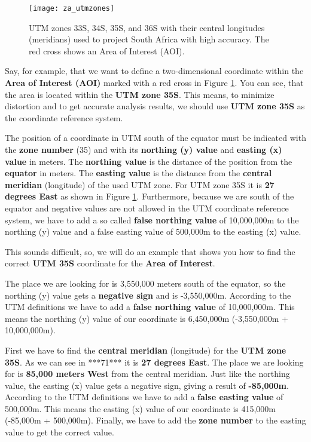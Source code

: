 \begin{figure}[ht]
   \begin{center}
   \caption{UTM zones 33S, 34S, 35S, and 36S with their central longitudes
(meridians) used to project South Africa with high accuracy. The red cross
shows an Area of Interest (AOI).}
\label{fig:zautmzones}\smallskip
   \texttt{[image: za\_utmzones]}
\end{center}
\end{figure}

Say, for example, that we want to define a two-dimensional coordinate within
the \textbf{Area of Interest (AOI)} marked with a red cross in Figure
\ref{fig:zautmzones}.
You can see, that the area is located within the \textbf{UTM zone 35S}. This
means, to
minimize distortion and to get accurate analysis results, we should use
\textbf{UTM zone 35S} as the coordinate reference system. 

The position of a coordinate in UTM south of the equator must be indicated
with the \textbf{zone number} (35) and with its \textbf{northing (y) value}
and \textbf{easting (x) value} in  meters. The \textbf{northing value} is the
distance of the position from the \textbf{equator} in meters. The
\textbf{easting value} is the distance from the \textbf{central
meridian} (longitude) of the used UTM zone. For UTM zone 35S it is \textbf{27
degrees East} as shown in Figure \ref{fig:zautmzones}. Furthermore, because
we are south of
the equator and negative values are not allowed in the UTM coordinate
reference system, we have to add a so called \textbf{false northing value} of
10,000,000m to the northing (y) value and a false easting value of 500,000m
to the easting (x) value.  

This sounds difficult, so, we will do an example that shows you how to find
the correct \textbf{UTM 35S} coordinate for the \textbf{Area of Interest}. 


The place we are looking for is 3,550,000 meters south of the equator, so the
northing (y) value gets a \textbf{negative sign} and is -3,550,000m.
According to the
UTM definitions we have to add a \textbf{false northing value} of
10,000,000m. This
means the northing (y) value of our coordinate is 6,450,000m (-3,550,000m +
10,000,000m).


First we have to find the \textbf{central meridian} (longitude) for the
\textbf{UTM zone 35S}.
As we can see in ***71*** it is \textbf{27 degrees East}. The place we are
looking for
is \textbf{85,000 meters West} from the central meridian. Just like the northing
value, the easting (x) value gets a negative sign, giving a result of
\textbf{-85,000m}. According to the UTM definitions we have to add a
\textbf{false easting value} of 500,000m. This means the easting (x) value of
our coordinate is
415,000m (-85,000m + 500,000m). Finally, we have to add the \textbf{zone
number} to the easting value to get the correct value.

